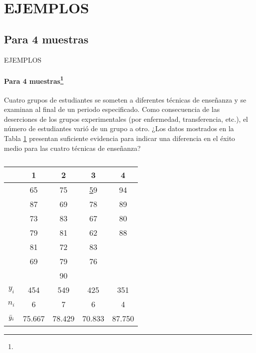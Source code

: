 \section{EJEMPLOS}
\subsection{Para 4 muestras}
\begin{frame}{EJEMPLOS}
    \framesubtitle{Para 4 muestras\footnote{}}
    
    Cuatro grupos de estudiantes se someten a diferentes técnicas de enseñanza y se examinan al final de un periodo especificado. Como consecuencia de las deserciones de los grupos experimentales (por enfermedad, transferencia, etc.), el número de estudiantes varió de un grupo a otro. ¿Los datos mostrados en la Tabla \ref{tab:ejem1} presentan suficiente evidencia para indicar una diferencia en el éxito medio para las cuatro técnicas de enseñanza?
    
    \begin{table}[H]
        \begin{tabular}{ccccc}
        \hline
                    & 1      & 2      & 3        & 4     \\ \hline
                    & 65     & 75     & {\ul 59} & 94    \\
                    & 87     & 69     & 78       & 89    \\
        {\ul }      & 73     & 83     & 67       & 80    \\
                    & 79     & 81     & 62       & 88    \\
                    & 81     & 72     & 83       &       \\
                    & 69     & 79     & 76       &       \\
                    &        & 90     &          &       \\ \hline
        $y_i$       & 454    & 549    & 425      & 351   \\
        $n_i$       & 6      & 7      & 6        & 4     \\
        $\Bar{y}_i$ & 75.667 & 78.429 & 70.833   & 87.750 \\ \hline
        \end{tabular}
        \caption{}
        \label{tab:ejem1}
    \end{table}
\end{frame}

